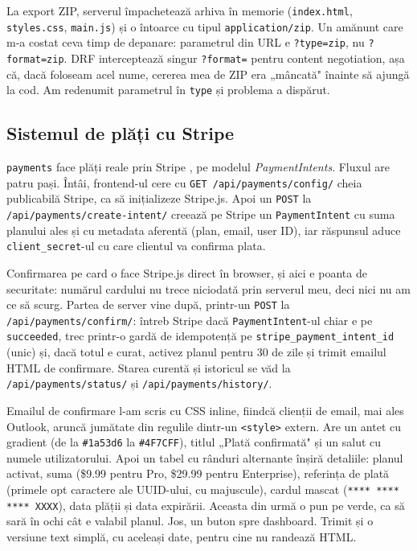 \documentclass[12pt,a4paper]{report}
\begin{document}
La export ZIP, serverul împachetează arhiva în memorie (\texttt{index.html},
\texttt{styles.css}, \texttt{main.js}) și o întoarce cu tipul
\texttt{application/zip}. Un amănunt care m-a costat ceva timp de depanare: parametrul
din URL e \texttt{?type=zip}, nu \texttt{?format=zip}. DRF interceptează singur
\texttt{?format=} pentru content negotiation, așa că, dacă foloseam acel nume, cererea
mea de ZIP era „mâncată" înainte să ajungă la cod. Am redenumit parametrul în
\texttt{type} și problema a dispărut.

\subsection{Sistemul de plăți cu Stripe}

\texttt{payments} face plăți reale prin Stripe \cite{stripedocs}, pe modelul
\textit{PaymentIntents}. Fluxul are patru pași. Întâi, frontend-ul cere cu
\texttt{GET /api/payments/config/} cheia publicabilă Stripe, ca să inițializeze
Stripe.js. Apoi un \texttt{POST} la \texttt{/api/payments/create-intent/} creează pe
Stripe un \texttt{PaymentIntent} cu suma planului ales și cu metadata aferentă (plan,
email, user ID), iar răspunsul aduce \texttt{client\_secret}-ul cu care clientul va
confirma plata.

Confirmarea pe card o face Stripe.js direct în browser, și aici e poanta de
securitate: numărul cardului nu trece niciodată prin serverul meu, deci nici nu am ce
să scurg. Partea de server vine după, printr-un \texttt{POST} la
\texttt{/api/payments/confirm/}: întreb Stripe dacă \texttt{PaymentIntent}-ul chiar e
pe \texttt{succeeded}, trec printr-o gardă de idempotență pe
\texttt{stripe\_payment\_intent\_id} (unic) și, dacă totul e curat, activez planul
pentru 30 de zile și trimit emailul HTML de confirmare. Starea curentă și istoricul se
văd la \texttt{/api/payments/status/} și \texttt{/api/payments/history/}.

Emailul de confirmare l-am scris cu CSS inline, fiindcă clienții de email, mai ales
Outlook, aruncă jumătate din regulile dintr-un \texttt{<style>} extern. Are un antet
cu gradient (de la \texttt{\#1a53d6} la \texttt{\#4F7CFF}), titlul „Plată confirmată"
și un salut cu numele utilizatorului. Apoi un tabel cu rânduri alternante înșiră
detaliile: planul activat, suma (\$9.99 pentru Pro, \$29.99 pentru Enterprise),
referința de plată (primele opt caractere ale UUID-ului, cu majuscule), cardul mascat
(\texttt{**** **** **** XXXX}), data plății și data expirării. Aceasta din urmă o
pun pe verde, ca să sară în ochi cât e valabil planul. Jos, un buton spre dashboard.
Trimit și o versiune text simplă, cu aceleași date, pentru cine nu randează HTML.
\end{document}
